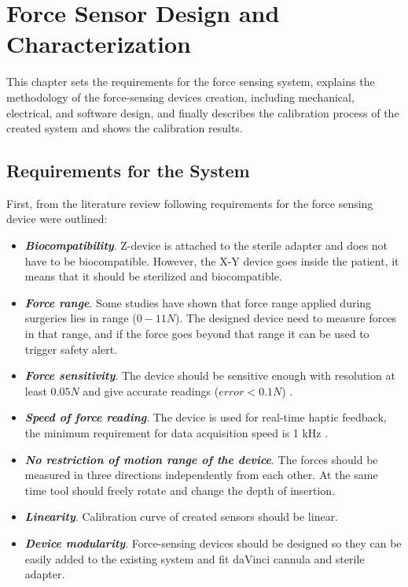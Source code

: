 \chapter{Force Sensor Design and Characterization}
\label{sen_des_char} %
This chapter sets the requirements for the force sensing system, explains the methodology of the force-sensing devices creation, including mechanical, electrical, and software design, and finally describes the calibration process of the created system and shows the calibration results. 

\section{Requirements for the System}
	\label{sec:DevReq}
		
	First, from the literature review following requirements for the force sensing device were outlined:
\begin{itemize}
    \item \textbf{\textit{Biocompatibility}}. Z-device is attached to the sterile adapter and does not have to be biocompatible. However, the X-Y device goes inside the patient, it means that it should be sterilized and biocompatible.
    
    \item \textbf{\textit{Force range}}. Some studies \cite{mack_interactive_2012, prasad_modular_2003 } have shown that force range applied during surgeries lies in range ($0-11 N$). The designed device need to measure forces in that range, and if the force goes beyond that range it can be used to trigger safety alert.
    
    \item \textbf{\textit{Force sensitivity}}. The device should be sensitive enough with resolution at least $0.05 N$ and give accurate readings ($error < 0.1 N$) \cite{mack_interactive_2012}.
    
    \item \textbf{\textit{Speed of force reading}}. The device is used for real-time haptic feedback, the minimum requirement for data acquisition speed is 1 kHz \cite{seungmoon_choi_effect_2004}.
    
    \item \textbf{\textit{No restriction of motion range of the device}}. The forces should be measured in three directions independently from each other. At the same time tool should freely rotate and change the depth of insertion.    
    
    \item \textbf{\textit{Linearity}}. Calibration curve of created sensors should be linear.

    \item \textbf{\textit{Device modularity}}. Force-sensing devices should be designed so they can be easily added to the existing system and fit daVinci cannula and sterile adapter.
\end{itemize}


